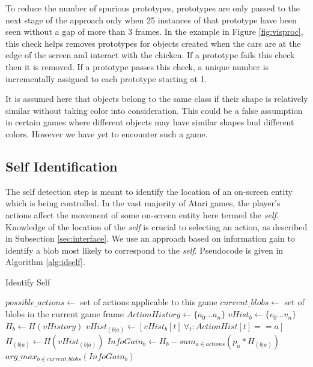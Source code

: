 \documentclass{acm_proc_article-sp}
\begin{document}
 To reduce the number of spurious prototypes, prototypes are only passed to the next stage of the approach only when 25 instances of that prototype have been seen without a gap of more than 3 frames. In the example in Figure \ref{fig:visproc}, this check helps removes prototypes for objects created when the cars are at the edge of the screen and interact with the chicken. If a prototype fails this check then it is removed. If a prototype passes this check, a unique number is incrementally assigned to each prototype starting at 1. 

It is assumed here that objects belong to the same class if their shape is relatively similar without taking color into consideration. This could be a false assumption in certain games where different objects may have similar shapes bud different colors. However we have yet to encounter such a game.

\subsection{Self Identification}
The self detection step is meant to identify the location of an on-screen entity which is being controlled. In the vast majority of Atari games, the player's actions affect the movement of some on-screen entity here termed the \textit{self}. Knowledge of the location of the \textit{self} is crucial to selecting an action, as described in Subsection \ref{sec:interface}. We use an approach based on information gain to identify a blob most likely to correspond to the \textit{self}. Pseudocode is given in Algorithm \ref{alg:idself}.

\begin{algorithm}
\caption{Identify Self}
\label{alg:idself}
\begin{algorithmic}[1]
  \STATE $possible\_actions \leftarrow $ set of actions applicable to this game
  \STATE $current\_blobs \leftarrow $ set of blobs in the current game frame
  \STATE $ActionHistory \leftarrow \{a_0...a_n\}$ %
  \STATE $vHist_b \leftarrow \{v_0...v_n\}$ %
  \STATE $H_b \leftarrow H(vHistory)$ 
  \STATE $vHist_{(b|a)} \leftarrow [vHist_b[t] ~\forall_t: ActionHist[t] == a]$ 
  \STATE $H_{(b|a)} \leftarrow H(vHist_{(b|a)})$ %
  \ENDFOR
  \STATE $InfoGain_b \leftarrow H_b - sum_{a \in actions}(p_a * H_{(b|a)})$ %
  \ENDFOR
  \RETURN $arg\_max_{b \in current\_blobs}(InfoGain_b)$ %
\end{algorithmic}
\end{algorithm}
\end{document}
